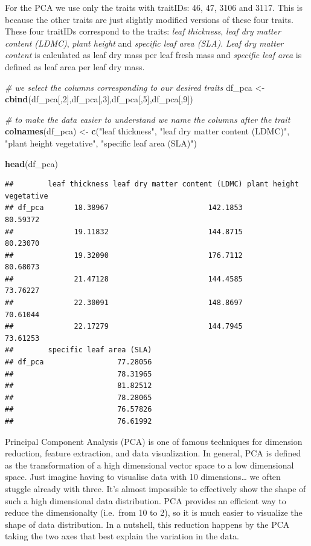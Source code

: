 \documentclass[
]{book}
\newenvironment{Shaded}{\begin{snugshade}}{\end{snugshade}}
\newcommand{\CommentTok}[1]{\textcolor[rgb]{0.56,0.35,0.01}{\textit{#1}}}
\newcommand{\DecValTok}[1]{\textcolor[rgb]{0.00,0.00,0.81}{#1}}
\newcommand{\KeywordTok}[1]{\textcolor[rgb]{0.13,0.29,0.53}{\textbf{#1}}}
\newcommand{\NormalTok}[1]{#1}
\newcommand{\StringTok}[1]{\textcolor[rgb]{0.31,0.60,0.02}{#1}}
\begin{document}
For the PCA we use only the traits with traitIDs: 46, 47, 3106 and 3117. This is because the other traits are just slightly modified versions of these four traits. These four traitIDs correspond to the traits: \emph{leaf thickness}, \emph{leaf dry matter content (LDMC)}, \emph{plant height} and \emph{specific leaf area (SLA)}. \emph{Leaf dry matter content} is calculated as leaf dry mass per leaf fresh mass and \emph{specific leaf area} is defined as leaf area per leaf dry mass.

\begin{Shaded}
\begin{Highlighting}[]
\CommentTok{# we select the columns corresponding to our desired traits}
\NormalTok{df_pca <-}\StringTok{ }\KeywordTok{cbind}\NormalTok{(df_pca[,}\DecValTok{2}\NormalTok{],df_pca[,}\DecValTok{3}\NormalTok{],df_pca[,}\DecValTok{5}\NormalTok{],df_pca[,}\DecValTok{9}\NormalTok{])}

\CommentTok{# to make the data easier to understand we name the columns after the trait}
\KeywordTok{colnames}\NormalTok{(df_pca) <-}\StringTok{ }\KeywordTok{c}\NormalTok{(}\StringTok{"leaf thickness"}\NormalTok{, }\StringTok{"leaf dry matter content (LDMC)"}\NormalTok{, }\StringTok{"plant height vegetative"}\NormalTok{, }\StringTok{"specific leaf area (SLA)"}\NormalTok{)}

\KeywordTok{head}\NormalTok{(df_pca)}
\end{Highlighting}
\end{Shaded}

\begin{verbatim}
##        leaf thickness leaf dry matter content (LDMC) plant height vegetative
## df_pca       18.38967                       142.1853                80.59372
##              19.11832                       144.8715                80.23070
##              19.32090                       176.7112                80.68073
##              21.47128                       144.4585                73.76227
##              22.30091                       148.8697                70.61044
##              22.17279                       144.7945                73.61253
##        specific leaf area (SLA)
## df_pca                 77.28056
##                        78.31965
##                        81.82512
##                        78.28065
##                        76.57826
##                        76.61992
\end{verbatim}

Principal Component Analysis (PCA) is one of famous techniques for dimension reduction, feature extraction, and data visualization. In general, PCA is defined as the transformation of a high dimensional vector space to a low dimensional space. Just imagine having to visualise data with 10 dimensions\ldots{} we often stuggle already with three. It's almost impossible to effectively show the shape of such a high dimensional data distribution. PCA provides an efficient way to reduce the dimensionalty (i.e.~from 10 to 2), so it is much easier to visualize the shape of data distribution. In a nutshell, this reduction happens by the PCA taking the two axes that best explain the variation in the data.
\end{document}

